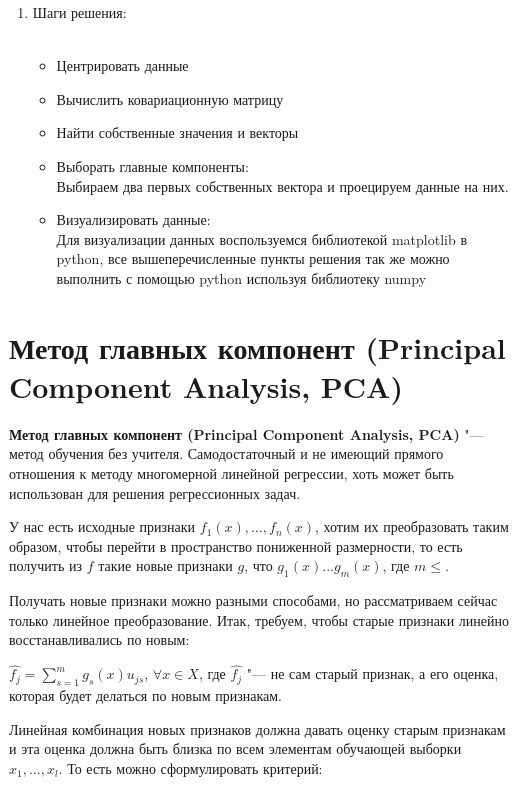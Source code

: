 \begin{enumerate}
    \item Шаги решения:\\\
          \begin{itemize}
              \item Центрировать данные \\
              \item Вычислить ковариационную матрицу \\
              \item Найти собственные значения и векторы \\
              \item Выборать главные компоненты: \\
                    Выбираем два первых собственных вектора и проецируем данные на них.
              \item Визуализировать данные: \\
                    Для визуализации данных воспользуемся библиотекой matplotlib в python, все вышеперечисленные пункты решения так же можно выполнить с помощью python используя библиотеку numpy
          \end{itemize}
\end{enumerate}

\section{Метод главных компонент  (Principal Component Analysis, PCA)}

\indent\textbf{Метод главных компонент  (Principal Component Analysis, PCA)} "--- метод обучения без учителя. Самодостаточный и не имеющий прямого отношения к методу многомерной линейной регрессии, хоть  может быть использован для решения регрессионных задач.

У нас есть исходные признаки $f_{1}(x), \dotsc, f_{n}(x)$, хотим их преобразовать таким образом, чтобы перейти в пространство пониженной размерности, то есть получить из $f$ такие новые признаки $g$, что $g_{1}(x)...g_{m}(x)$, где $m\leq$.

Получать новые признаки можно разными способами, но рассматриваем сейчас только линейное преобразование. Итак, требуем, чтобы старые признаки линейно восстанавливались по новым:\par
$\hat{f_j} = \displaystyle\sum_{s=1}^{m} g_s(x)u_{js}$, $\forall x \in X$, где $\hat{f_j}$ "--- не сам старый признак, а его оценка, которая будет делаться по новым признакам. \par Линейная комбинация новых признаков должна давать оценку старым признакам и эта оценка должна быть близка по всем элементам обучающей выборки $x_1, \dotsc, x_l$. То есть можно сформулировать критерий:\par

